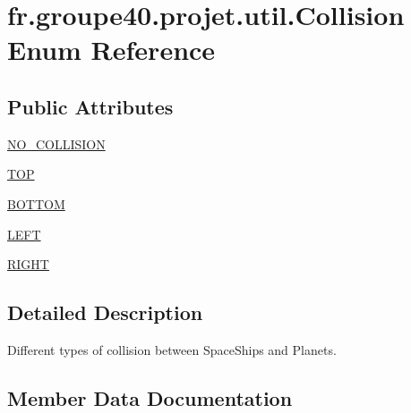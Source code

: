 \hypertarget{enumfr_1_1groupe40_1_1projet_1_1util_1_1_collision}{}\section{fr.\+groupe40.\+projet.\+util.\+Collision Enum Reference}
\label{enumfr_1_1groupe40_1_1projet_1_1util_1_1_collision}
\subsection*{Public Attributes}
\begin{DoxyCompactItemize}
\item 
\mbox{\hyperlink{enumfr_1_1groupe40_1_1projet_1_1util_1_1_collision_a007237d39993e1e03b2fde3e8fa91847}{N\+O\+\_\+\+C\+O\+L\+L\+I\+S\+I\+ON}}
\item 
\mbox{\hyperlink{enumfr_1_1groupe40_1_1projet_1_1util_1_1_collision_a0e45de89c8e4ab6450f428f13330bdf8}{T\+OP}}
\item 
\mbox{\hyperlink{enumfr_1_1groupe40_1_1projet_1_1util_1_1_collision_a299b5a34c0c8ccbcd32ee78f6af8501a}{B\+O\+T\+T\+OM}}
\item 
\mbox{\hyperlink{enumfr_1_1groupe40_1_1projet_1_1util_1_1_collision_ab3dd45d1ad2a6fa77524f448ee4cb8a7}{L\+E\+FT}}
\item 
\mbox{\hyperlink{enumfr_1_1groupe40_1_1projet_1_1util_1_1_collision_aff12efe840cb22c3804893540ab2812d}{R\+I\+G\+HT}}
\end{DoxyCompactItemize}


\subsection{Detailed Description}
Different types of collision between Space\+Ships and Planets. 

\subsection{Member Data Documentation}
\mbox{\label{enumfr_1_1groupe40_1_1projet_1_1util_1_1_collision_a299b5a34c0c8ccbcd32ee78f6af8501a}} 
